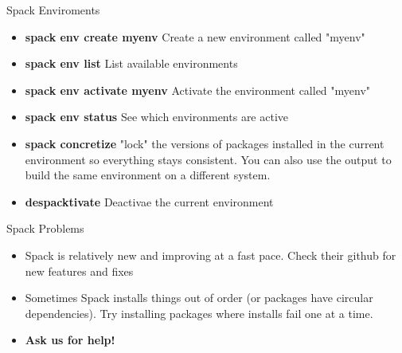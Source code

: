 \begin{frame}{Spack Enviroments}
	\begin{itemize}
		\item \textbf{spack env create myenv} Create a new environment called "myenv"
		\item \textbf{spack env list} List available environments
		\item \textbf{spack env activate myenv} Activate the environment called "myenv"
		\item \textbf{spack env status} See which environments are active
		\item \textbf{spack concretize} "lock" the versions of packages installed in the current environment so everything stays consistent. You can also use the output to build the same environment on a different system.
		\item \textbf{despacktivate} Deactivae the current environment
	\end{itemize}
\end{frame}

\begin{frame}{Spack Problems}
	\begin{itemize}
		\item Spack is relatively new and improving at a fast pace. Check their github for new features and fixes
		\item Sometimes Spack installs things out of order (or packages have circular dependencies). Try installing packages where installs fail one at a time.
		\item \textbf{Ask us for help!}
	\end{itemize}
\end{frame}
